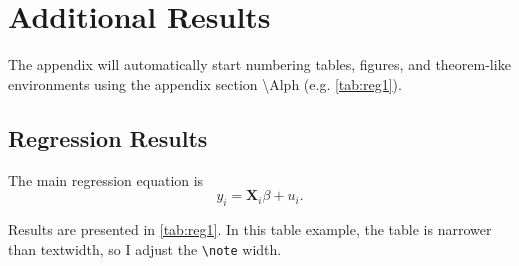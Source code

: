 \documentclass[12pt]{article}
\begin{document}
\newpage~\printbibliography

\newpage~\appendix

\section{Additional Results}

The appendix will automatically start numbering tables, figures, and theorem-like environments using the appendix section \textbackslash Alph (e.g. \autoref{tab:reg1}).

\citet{mas1995microeconomic} 

\subsection{Regression Results}

The main regression equation is 
\begin{equation}
  y_i = \bm{X}_i \beta + u_i.
\end{equation}

Results are presented in \autoref{tab:reg1}. In this table example, the table is narrower than textwidth, so I adjust the \texttt{\textbackslash note} width. 
\end{document}
